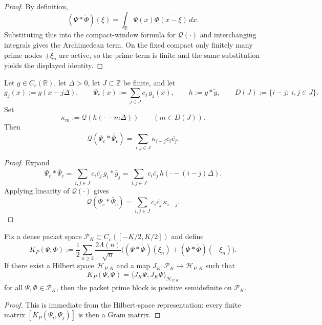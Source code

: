 \begin{proof}
By definition,
\[
  (\Psi * \widetilde{\Phi})(\xi)
  =
  \int_{\mathbb R}\Psi(x)\overline{\Phi(x-\xi)}\,dx.
\]
Substituting this into the compact-window formula for $\mathcal Q(\cdot)$ and
interchanging integrals gives the Archimedean term. On the fixed compact only
finitely many prime nodes $\pm\xi_n$ are active, so the prime term is finite
and the same substitution yields the displayed identity.
\end{proof}

\begin{theorem}\label{thm:packet-rayleigh-pd}
Let $g\in C_c(\mathbb R)$, let $\Delta>0$, let $J\subset\mathbb Z$ be finite, and let
\[
  g_j(x):=g(x-j\Delta),
  \qquad
  \Psi_c(x):=\sum_{j\in J} c_j\,g_j(x),
  \qquad
  h:=g*\widetilde g,
  \qquad
  D(J):=\{i-j:\ i,j\in J\}.
\]
Set
\[
  \kappa_m:=\mathcal Q(h(\cdot-m\Delta))
  \qquad (m\in D(J)).
\]
Then
\[
  \mathcal Q(\Psi_c * \widetilde{\Psi_c})
  =
  \sum_{i,j\in J} \kappa_{i-j} c_i\overline{c_j}.
\]
\end{theorem}

\begin{proof}
Expand
\[
  \Psi_c * \widetilde{\Psi_c}
  =
  \sum_{i,j\in J} c_i\overline{c_j}\,
  g_i*\widetilde{g_j}
  =
  \sum_{i,j\in J} c_i\overline{c_j}\,
  h(\cdot-(i-j)\Delta).
\]
Applying linearity of $\mathcal Q(\cdot)$ gives
\[
  \mathcal Q(\Psi_c * \widetilde{\Psi_c})
  =
  \sum_{i,j\in J} c_i\overline{c_j}\,\kappa_{i-j}.
\]
\end{proof}

\begin{proposition}\label{prop:desired-prime-factorization}
Fix a dense packet space $\mathcal P_K\subset C_c([-K/2,K/2])$ and define
\[
  K_P(\Psi,\Phi)
  :=
  \frac12\sum_{n\ge2}\frac{2\Lambda(n)}{\sqrt n}
  \bigl((\Psi * \widetilde{\Phi})(\xi_n)+(\Psi * \widetilde{\Phi})(-\xi_n)\bigr).
\]
If there exist a Hilbert space $\mathcal H_{P,K}$ and a map
$J_K:\mathcal P_K\to\mathcal H_{P,K}$ such that
\[
  K_P(\Psi,\Phi)=\langle J_K\Psi,J_K\Phi\rangle_{\mathcal H_{P,K}}
\]
for all $\Psi,\Phi\in\mathcal P_K$, then the packet prime block is positive
semidefinite on $\mathcal P_K$.
\end{proposition}

\begin{proof}
This is immediate from the Hilbert-space representation: every finite matrix
$[K_P(\Psi_i,\Psi_j)]$ is then a Gram matrix.
\end{proof}

